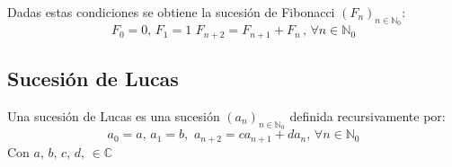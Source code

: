 \documentclass[10pt]{article}
\begin{document}
Dadas estas condiciones se obtiene la sucesión de Fibonacci $(F_{n})_{n \in \mathbb{N}_0}$:
$$ F_0 = 0, \, F_1 = 1 \, \, F_{n+2} = F_{n+1} + F_n \, , \, \forall n \in \mathbb{N}_0$$


\begin{center}
 \subsection{Sucesión de Lucas}
\end{center}

Una sucesión de Lucas es una sucesión $(a_n)_{n \in \mathbb{N}_0}$ definida recursivamente por:
$$a_0 = a, \, a_1 = b, \, \, a_{n+2} = c a_{n+1} + d a_n, \, \forall n \in \mathbb{N}_0$$
Con $a, \, b, \, c, \, d, \, \in \mathbb{C}$ 
\end{document}
